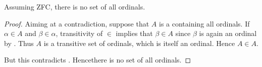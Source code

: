 \begin{theorem}\label{thm:burali_forti_paradox}
  Assuming ZFC, there is no set of all ordinals.
\end{theorem}
\begin{proof}
  Aiming at a contradiction, suppose that \( A \) is a containing all ordinals. If \( \alpha \in A \) and \( \beta \in \alpha \), transitivity of \( \in \) implies that \( \beta \in A \) since \( \beta \) is again an ordinal by . Thus \( A \) is a transitive set of ordinals, which  is itself an ordinal. Hence \( A \in A \).

  But this contradicts . Hence\DNE there is no set of all ordinals.
\end{proof}

